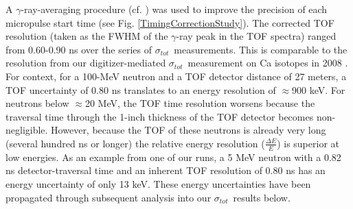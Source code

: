 \documentclass[twocolumn,secnumarabic,amssymb, nobibnotes, aps, prl,
superscriptaddress, nobalancelastpage]{revtex4}
\newcommand{\tot}{\ensuremath{\sigma_{tot}}}
\begin{document}
A $\gamma$-ray-averaging procedure (cf. \cite{Shane2010}) was
used to improve the precision of each micropulse start time (see Fig.
\ref{TimingCorrectionStudy}). The corrected TOF resolution (taken
as the FWHM of the $\gamma$-ray peak in the TOF spectra) ranged from
0.60-0.90 ns over the series of \tot\ measurements.
This is comparable to the resolution from 
our digitizer-mediated \tot\ measurement on Ca isotopes in 2008 \cite{Shane2010}.
For context, for a 100-MeV neutron and a TOF detector distance of 27 meters, a TOF 
uncertainty of 0.80 ns translates to an energy resolution of $\approx$900 keV.
For neutrons below $\approx$20 MeV, the TOF time resolution worsens because the traversal time 
through the 1-inch thickness of the TOF detector becomes non-negligible.
However, because the TOF of these neutrons is already very long (several hundred ns or
longer) the relative energy resolution ($\frac{\Delta E}{E}$) is
superior at low energies. As an example from one of our runs, a 5 MeV neutron with
a 0.82 ns detector-traversal time and an inherent TOF resolution of 0.80 ns
has an energy uncertainty of only 13 keV. These energy uncertainties
have been propagated through subsequent analysis into our \tot\ results below.
\end{document}
